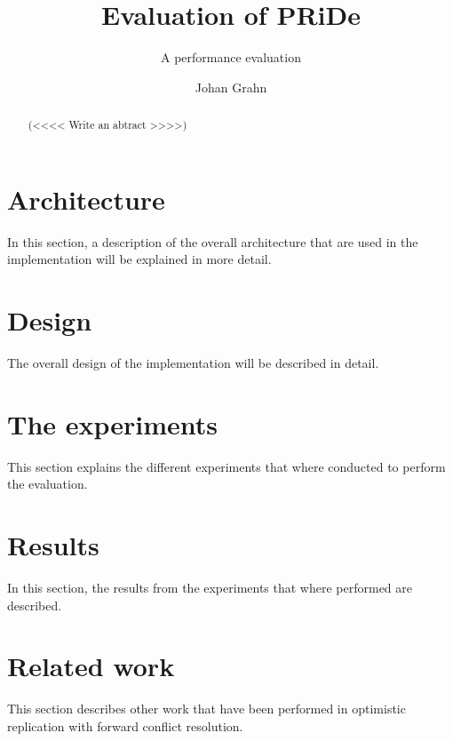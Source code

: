 \documentclass[MSc, ida]{histhesis}
\title{Evaluation of PRiDe}
\subtitle{A performance evaluation}
\author{Johan Grahn}
\begin{document}
\maketitle
\begin{abstract}

(<<<< Write an abtract >>>>)

\end{abstract}
\tableofcontents
\thispagestyle{plain}
\listoftables
\newpage

\newpage

\newpage

\newpage

\newpage

\section{Architecture} %
\label{sec:arch}

In this section, a description of the overall architecture that are used in the implementation will be explained in more detail.  


\section{Design} %
\label{sec:design}

The overall design of the implementation will be described in detail. 


\section{The experiments} %
\label{sec:the_experiments}

This section explains the different experiments that where conducted to perform the evaluation. 

\section{Results} %
\label{sec:results}

In this section, the results from the experiments that where performed are described. 

\section{Related work} %
\label{sec:future_work}

This section describes other work that have been performed in optimistic replication with forward conflict resolution.
\end{document}
